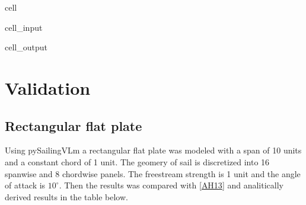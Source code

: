 \documentclass[letterpaper,10pt,english]{jupyterBook}
\begin{document}
\begin{sphinxuseclass}{cell}\begin{sphinxVerbatimInput}

\begin{sphinxuseclass}{cell_input}
\begin{sphinxVerbatim}[commandchars=\\\{\}]
  
\end{sphinxVerbatim}

\end{sphinxuseclass}\end{sphinxVerbatimInput}
\begin{sphinxVerbatimOutput}

\begin{sphinxuseclass}{cell_output}
\end{sphinxuseclass}\end{sphinxVerbatimOutput}

\end{sphinxuseclass}
\sphinxstepscope


\chapter{Validation}
\label{\detokenize{chapters/validation/validation:validation}}\label{\detokenize{chapters/validation/validation::doc}}
\sphinxstepscope


\section{Rectangular flat plate}
\label{\detokenize{chapters/validation/flat_plate:rectangular-flat-plate}}\label{\detokenize{chapters/validation/flat_plate::doc}}
\sphinxAtStartPar
Using pySailingVLm a rectangular flat plate was modeled with a span of 10 units and a constant chord of 1 unit. The geomery of sail is discretized into 16 spanwise and 8 chordwise panels. The free\sphinxhyphen{}stream strength is 1 unit and the angle of attack is \(10^\circ\). Then the results was compared with {[}\hyperlink{cite.chapters/bibliography:id2}{AH13}{]} and analitically derived results in the table below.
\end{document}
